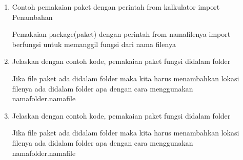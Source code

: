 \begin{enumerate}
\item  Contoh pemakaian paket dengan perintah from kalkulator import Penambahan 

Pemakaian package(paket) dengan perintah from namafilenya import berfungsi untuk memanggil fungsi dari nama filenya


\item Jelaskan dengan contoh kode, pemakaian paket fungsi didalam folder

Jika file paket ada didalam folder maka kita harus menambahkan lokasi filenya ada didalam folder apa dengan cara menggunakan namafolder.namafile


\item Jelaskan dengan contoh kode, pemakaian paket fungsi didalam folder

Jika file paket ada didalam folder maka kita harus menambahkan lokasi filenya ada didalam folder apa dengan cara menggunakan namafolder.namafile

\end{enumerate}

